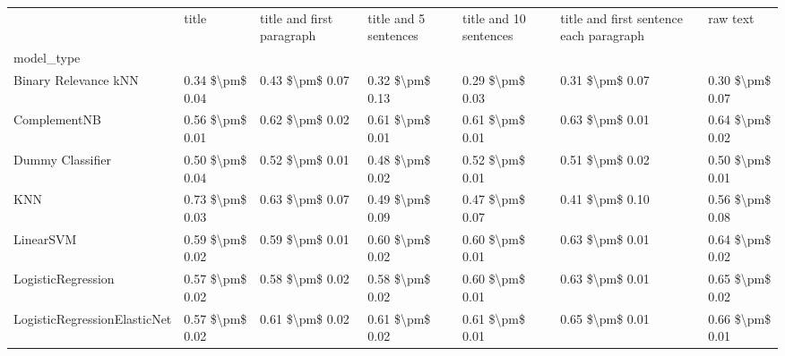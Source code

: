 \begin{tabular}{lllllll}
\toprule
{} &            title & title and first paragraph & title and 5 sentences & title and 10 sentences & title and first sentence each paragraph &             raw text \\
model\_type                      &                  &                           &                       &                        &                                         &                      \\
\midrule
Binary Relevance kNN            &  0.34 \$\textbackslash pm\$ 0.04 &           0.43 \$\textbackslash pm\$ 0.07 &       0.32 \$\textbackslash pm\$ 0.13 &        0.29 \$\textbackslash pm\$ 0.03 &                         0.31 \$\textbackslash pm\$ 0.07 &      0.30 \$\textbackslash pm\$ 0.07 \\
ComplementNB                    &  0.56 \$\textbackslash pm\$ 0.01 &           0.62 \$\textbackslash pm\$ 0.02 &       0.61 \$\textbackslash pm\$ 0.01 &        0.61 \$\textbackslash pm\$ 0.01 &                         0.63 \$\textbackslash pm\$ 0.01 &      0.64 \$\textbackslash pm\$ 0.02 \\
Dummy Classifier                &  0.50 \$\textbackslash pm\$ 0.04 &           0.52 \$\textbackslash pm\$ 0.01 &       0.48 \$\textbackslash pm\$ 0.02 &        0.52 \$\textbackslash pm\$ 0.01 &                         0.51 \$\textbackslash pm\$ 0.02 &      0.50 \$\textbackslash pm\$ 0.01 \\
KNN                             &  0.73 \$\textbackslash pm\$ 0.03 &           0.63 \$\textbackslash pm\$ 0.07 &       0.49 \$\textbackslash pm\$ 0.09 &        0.47 \$\textbackslash pm\$ 0.07 &                         0.41 \$\textbackslash pm\$ 0.10 &      0.56 \$\textbackslash pm\$ 0.08 \\
LinearSVM                       &  0.59 \$\textbackslash pm\$ 0.02 &           0.59 \$\textbackslash pm\$ 0.01 &       0.60 \$\textbackslash pm\$ 0.02 &        0.60 \$\textbackslash pm\$ 0.01 &                         0.63 \$\textbackslash pm\$ 0.01 &      0.64 \$\textbackslash pm\$ 0.02 \\
LogisticRegression              &  0.57 \$\textbackslash pm\$ 0.02 &           0.58 \$\textbackslash pm\$ 0.02 &       0.58 \$\textbackslash pm\$ 0.02 &        0.60 \$\textbackslash pm\$ 0.01 &                         0.63 \$\textbackslash pm\$ 0.01 &      0.65 \$\textbackslash pm\$ 0.02 \\
LogisticRegressionElasticNet    &  0.57 \$\textbackslash pm\$ 0.02 &           0.61 \$\textbackslash pm\$ 0.02 &       0.61 \$\textbackslash pm\$ 0.02 &        0.61 \$\textbackslash pm\$ 0.01 &                         0.65 \$\textbackslash pm\$ 0.01 &      0.66 \$\textbackslash pm\$ 0.01 \\

\end{tabular}
